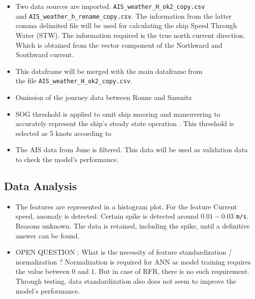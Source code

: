 \begin{itemize}
    \item Two data sources are imported. {\tt AIS\_weather\_H\_ok2\_copy.csv} \\ and {\tt AIS\_weather\_h\_rename\_copy.csv}. The information from the latter comma delimited 
    file will be used for calculating the ship Speed Through Water (STW).  
    The information required is the true north current direction. Which is obtained from the vector component of the Northward and Southward current.
    \item This dataframe will be merged with the main dataframe from \\ the file {\tt AIS\_weather\_H\_ok2\_copy.csv}.
    \item Omission of the journey data between Ronne and Sassnitz
    \item SOG threshold is applied to omit ship mooring and maneuvering to accurately represent the ship's steady state operation 
    \cite{Abebe.2020,BalBesikci.2016,Gkerekos.2019,Yang.2020}. This threshold is selected as 5 knots according to \cite{Abebe.2020}
    \item The AIS data from June is filtered. This data will be used as validation data to check the model's performance.
\end{itemize}
 
\subsection{Data Analysis}
\begin{itemize}
    \item The features are represented in a histogram plot. For the feature Current speed, anomaly is detected. Certain spike is detected around $0.01 - 0.03$ \verb|m/s|. Reasons unknown. The data is retained, including the spike, until a definitive answer can be found.
    \item OPEN QUESTION : What is the necessity of feature standardization / normalization ? Normalization is required for ANN as model training requires the value between 0 and 1. But in case of RFR, there is no such requirement. Through testing, data standardization also does not seem to improve the model's performance. 
\end{itemize}

